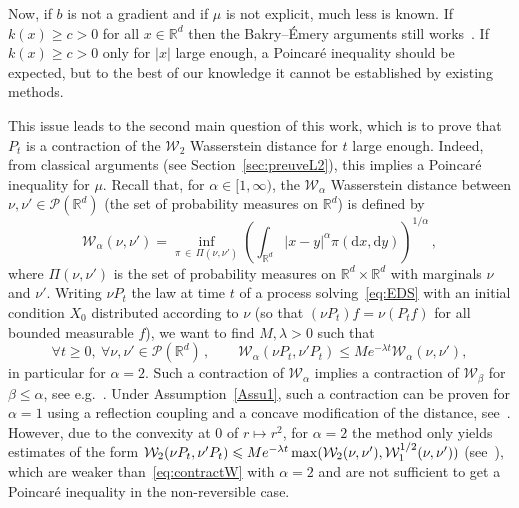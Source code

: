\documentclass[10pt]{amsart}
\theoremstyle{definition}\newtheorem{defi}[theo]{Definition}\newtheorem{rema}[theo]{Remark}\newtheorem{exam}[theo]{Example}\newtheorem{exem}[theo]{Example}\newtheorem{nota}[theo]{Notation}
\newcommand{\R}{\mathbb R}
\newcommand{\clP}{\mathcal P}
\newcommand{\clW}{\mathcal W}
\newcommand{\dd}{\mathrm{d}}
\newcommand{\1}{\mathbbm{1}}
\let\oldforall\forall
\renewcommand*{\forall}{\mathrel{\oldforall}}
\begin{document}
Now, if $b$ is not a gradient and if $\mu$ is not explicit, much less is known. If $k(x)\geqslant c>0$ for all $x\in\R^d$ then the Bakry--Émery arguments still works~\cite{CattiauxGuillinSLC,MonmarcheContraction}. If $k(x) \geqslant c>0$ only for $|x|$ large enough, a Poincaré inequality should be expected, but to the best of our knowledge it cannot be established by existing methods.

This issue leads to the second main question of this work, which is to prove that $P_t$ is a contraction of the $\clW_2$ Wasserstein distance for $t$ large enough. Indeed, from classical arguments (see Section~\ref{sec:preuveL2}), this implies a Poincaré inequality for $\mu$. Recall that, for $\alpha\in[1,\infty)$, the $\clW_\alpha$ Wasserstein distance between $\nu,\nu'\in\clP(\R^d)$ (the set of probability measures on $\R^d$) is defined by
\[
\clW_\alpha(\nu,\nu') = \inf_{\pi\,\in\,\Pi(\nu,\nu')} \left( \int_{\R^d} |x-y|^\alpha \pi(\dd x,\dd y)\right)^{1/\alpha}\,,
\]
where $\Pi(\nu,\nu')$ is the set of probability measures on $\R^d\times\R^d$ with marginals $\nu$ and $\nu'$. Writing $\nu P_t$ the law at time $t$ of a process solving~\eqref{eq:EDS} with an initial condition $X_0$ distributed according to $\nu$ (so that $(\nu P_t) f = \nu(P_t f)$ for all bounded measurable $f$), we want to find $M,\lambda>0$ such that
\begin{equation}\label{eq:contractW}
\forall t\geqslant 0,\ \forall \nu,\nu'\in\clP(\R^d)\,,\qquad
\clW_\alpha(\nu P_t,\nu' P_t) \leqslant M e^{-\lambda t} \clW_\alpha(\nu,\nu'),
\end{equation}
in particular for $\alpha=2$. Such a contraction of $\clW_\alpha$ implies a contraction of $\clW_{\beta}$ for \linebreak$\beta\leqslant \alpha$, see e.g.~\cite{MonmarcheContraction}. Under Assumption~\ref{Assu1}, such a contraction can be proven for $\alpha=1$ using a reflection coupling and a concave modification of the distance, see~\cite{Eberle2,Eberle1}. However, due to the convexity at $0$ of $r\mapsto r^2$, for $\alpha=2$ the method only yields estimates of the form $\clW_2(\nu P_t,\nu' P_t) \leqslant M e^{-\lambda t} \max(\clW_{2}(\nu,\nu'),\linebreak \clW_1^{1/2}(\nu,\nu'))$ (see~\cite{JWang2,JWang1}), which are weaker than~\eqref{eq:contractW} with $\alpha=2$ and are not sufficient to get a Poincaré inequality in the non-reversible case.
\end{document}
